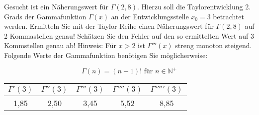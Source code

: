 \item Gesucht ist ein Näherungswert für $\Gamma(2{,}8)$. Hierzu soll die Taylorentwicklung 2. Grads der Gammafunktion $\Gamma(x)$ an der Entwicklungsstelle $x_0=3$ betrachtet werden. Ermitteln Sie mit der Taylor-Reihe einen Näherungswert für $\Gamma(2{,}8)$ auf 2 Kommastellen genau! Schätzen Sie den Fehler auf den so ermittelten Wert auf 3 Kommstellen genau ab! Hinweis: Für $x>2$ ist $\Gamma'''(x)$ streng monoton steigend. Folgende Werte der Gammafunktion benötigen Sie möglicherweise:

\begin{multicols}{2}

$$\Gamma(n) = (n-1)! \text{ für } n \in \mathbb{N}^{+}$$

\begin{tabular}{ c | c | c | c | c}
	$\Gamma'(3)$ & $\Gamma''(3)$ & $\Gamma'''(3)$ & $\Gamma''''(3)$ & $\Gamma'''''(3)$ \\
	\hline
	1{,}85         &  2{,}50         & 3{,}45           &  5{,}52           & 8{,}85
\end{tabular}

\end{multicols}
